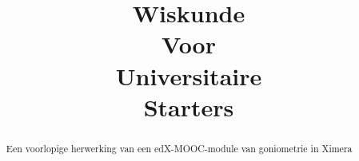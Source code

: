 \documentclass[numbers]{xourse}
\title{Wiskunde\\ Voor \\ Universitaire \\ Starters}
\begin{document}
\begin{abstract}
	Een voorlopige herwerking van een edX-MOOC-module  van goniometrie in Ximera
\end{abstract}
\maketitle



\end{document}
